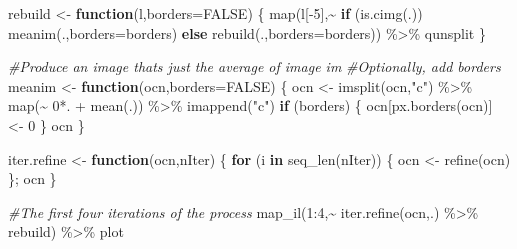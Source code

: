 \documentclass[
]{article}
\newenvironment{Shaded}{\begin{snugshade}}{\end{snugshade}}
\newcommand{\AttributeTok}[1]{\textcolor[rgb]{0.77,0.63,0.00}{#1}}
\newcommand{\CommentTok}[1]{\textcolor[rgb]{0.56,0.35,0.01}{\textit{#1}}}
\newcommand{\ConstantTok}[1]{\textcolor[rgb]{0.00,0.00,0.00}{#1}}
\newcommand{\ControlFlowTok}[1]{\textcolor[rgb]{0.13,0.29,0.53}{\textbf{#1}}}
\newcommand{\DecValTok}[1]{\textcolor[rgb]{0.00,0.00,0.81}{#1}}
\newcommand{\FunctionTok}[1]{\textcolor[rgb]{0.00,0.00,0.00}{#1}}
\newcommand{\NormalTok}[1]{#1}
\newcommand{\OtherTok}[1]{\textcolor[rgb]{0.56,0.35,0.01}{#1}}
\newcommand{\SpecialCharTok}[1]{\textcolor[rgb]{0.00,0.00,0.00}{#1}}
\newcommand{\StringTok}[1]{\textcolor[rgb]{0.31,0.60,0.02}{#1}}
\begin{document}
\begin{Shaded}
\begin{Highlighting}[]
\NormalTok{rebuild }\OtherTok{\textless{}{-}} \ControlFlowTok{function}\NormalTok{(l,}\AttributeTok{borders=}\ConstantTok{FALSE}\NormalTok{)}
\NormalTok{\{}
    \FunctionTok{map}\NormalTok{(l[}\SpecialCharTok{{-}}\DecValTok{5}\NormalTok{],}\SpecialCharTok{\textasciitilde{}} \ControlFlowTok{if}\NormalTok{ (}\FunctionTok{is.cimg}\NormalTok{(.)) }\FunctionTok{meanim}\NormalTok{(.,}\AttributeTok{borders=}\NormalTok{borders) }\ControlFlowTok{else} \FunctionTok{rebuild}\NormalTok{(.,}\AttributeTok{borders=}\NormalTok{borders)) }\SpecialCharTok{\%\textgreater{}\%}\NormalTok{ qunsplit}
\NormalTok{\}}

\CommentTok{\#Produce an image that\textquotesingle{}s just the average of image im}
\CommentTok{\#Optionally, add borders}
\NormalTok{meanim }\OtherTok{\textless{}{-}} \ControlFlowTok{function}\NormalTok{(ocn,}\AttributeTok{borders=}\ConstantTok{FALSE}\NormalTok{)}
\NormalTok{\{}
\NormalTok{    ocn }\OtherTok{\textless{}{-}} \FunctionTok{imsplit}\NormalTok{(ocn,}\StringTok{"c"}\NormalTok{) }\SpecialCharTok{\%\textgreater{}\%} \FunctionTok{map}\NormalTok{(}\SpecialCharTok{\textasciitilde{}} \DecValTok{0}\SpecialCharTok{*}\NormalTok{. }\SpecialCharTok{+} \FunctionTok{mean}\NormalTok{(.)) }\SpecialCharTok{\%\textgreater{}\%} \FunctionTok{imappend}\NormalTok{(}\StringTok{"c"}\NormalTok{)}
    \ControlFlowTok{if}\NormalTok{ (borders)}
\NormalTok{    \{}
\NormalTok{        ocn[}\FunctionTok{px.borders}\NormalTok{(ocn)] }\OtherTok{\textless{}{-}} \DecValTok{0}
\NormalTok{    \}}
\NormalTok{    ocn}
\NormalTok{\}}
\end{Highlighting}
\end{Shaded}

\begin{Shaded}
\begin{Highlighting}[]
\NormalTok{iter.refine }\OtherTok{\textless{}{-}} \ControlFlowTok{function}\NormalTok{(ocn,nIter)}
\NormalTok{\{}
    \ControlFlowTok{for}\NormalTok{ (i }\ControlFlowTok{in} \FunctionTok{seq\_len}\NormalTok{(nIter)) \{ ocn }\OtherTok{\textless{}{-}} \FunctionTok{refine}\NormalTok{(ocn) \};}
\NormalTok{    ocn}
\NormalTok{\}}

\CommentTok{\#The first four iterations of the process}
\FunctionTok{map\_il}\NormalTok{(}\DecValTok{1}\SpecialCharTok{:}\DecValTok{4}\NormalTok{,}\SpecialCharTok{\textasciitilde{}} \FunctionTok{iter.refine}\NormalTok{(ocn,.) }\SpecialCharTok{\%\textgreater{}\%}\NormalTok{ rebuild) }\SpecialCharTok{\%\textgreater{}\%}\NormalTok{ plot}
\end{Highlighting}
\end{Shaded}
\end{document}
